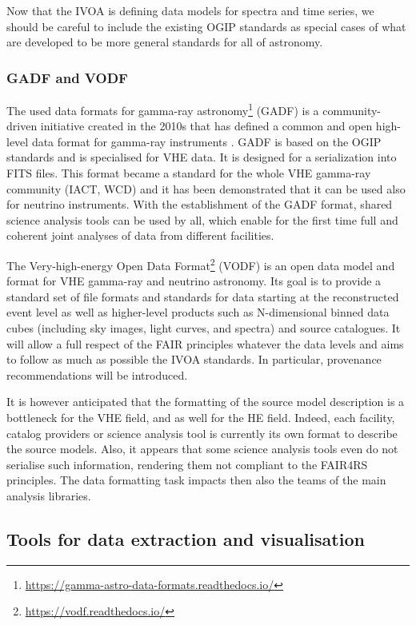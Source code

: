 \documentclass[11pt,a4paper]{ivoa}
\begin{document}
Now that the IVOA is defining data models for spectra and time series, we should be careful to include the existing OGIP
standards as special cases of what are developed to be more general standards for all of astronomy.

\subsubsection{GADF and VODF}
\label{sec:GADF}

The used data formats for gamma-ray astronomy\footnote{\url{https://gamma-astro-data-formats.readthedocs.io/}} (GADF) is a community-driven initiative created in the
2010s that has defined a common and open high-level data format for gamma-ray instruments \citep{2017AIPC.1792g0006D,2021-DF}.
GADF is based on the OGIP standards and is specialised for VHE data. It is designed for a serialization into FITS files.
This format became a standard for the whole VHE gamma-ray community (IACT, WCD) and it has been demonstrated that it can
be used also for neutrino instruments. With the establishment of the GADF format, shared science analysis tools can be
used by all, which enable for the first time full and coherent joint analyses of data from different facilities.

The Very-high-energy Open Data Format\footnote{\url{https://vodf.readthedocs.io/}} (VODF) is an open data model and
format for VHE gamma-ray and neutrino astronomy. Its goal is to provide a standard set of file formats and standards
for data starting at the reconstructed event level as well as higher-level products such as N-dimensional binned data
cubes (including sky images, light curves, and spectra) and source catalogues. It will allow a full respect of the FAIR
principles whatever the data levels and aims to follow as much as possible the IVOA standards. In particular, provenance
recommendations will be introduced.

It is however anticipated that the formatting of the source model description is a bottleneck for the VHE field, and
as well for the HE field. Indeed, each facility, catalog providers or science analysis tool is currently its own format
to describe the source models. Also, it appears that some science analysis tools even do not serialise such information,
rendering them not compliant to the FAIR4RS principles. The data formatting task impacts then also the teams of the main
analysis libraries.

\subsection{Tools for data extraction and visualisation}
\label{sec:tools}
\end{document}
